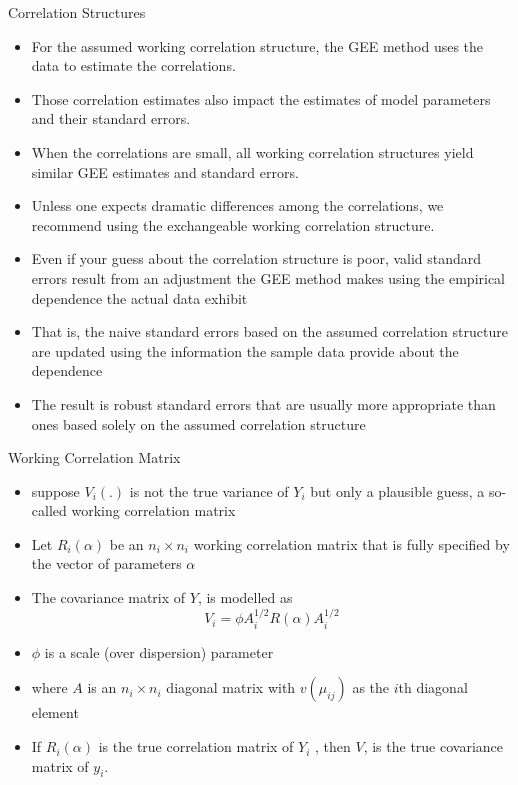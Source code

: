 \documentclass{beamer}
\begin{document}
\begin{frame} {Correlation Structures}
\begin{itemize}
\item For the assumed working correlation structure, the GEE method uses the data to estimate the correlations. \vspace{0.25cm}
\item Those correlation estimates also impact the estimates of model parameters and their standard errors. \vspace{0.25cm}
\item When the correlations are small, all working correlation structures yield similar GEE estimates and standard errors. \vspace{0.25cm}
\item Unless one expects dramatic differences among the correlations, we recommend using the exchangeable working correlation structure.
\end{itemize}
\end{frame}

\begin{frame}
\begin{itemize}
\item Even if your guess about the correlation structure is poor, valid standard errors result from an adjustment the GEE method makes using the empirical dependence the actual data exhibit \vspace{0.25cm}
\item That is, the naive standard errors based on the assumed correlation structure are updated using the information the sample data provide about the dependence \vspace{0.25cm}
\item The result is robust standard errors that are usually more appropriate than ones based solely on the assumed correlation structure
\end{itemize}
\end{frame}

\begin{frame}{ Working Correlation Matrix}
\begin{itemize}
	\item suppose $V_i(.)$ is not the true variance of $Y_i$ but only a plausible guess, a so-called working correlation matrix
	\item Let $R_i(\alpha)$ be an $n_i\times n_i$ working correlation matrix that is fully specified by the vector of parameters $\alpha$
	\item The covariance matrix of $Y$, is modelled as 
	\[V_i=\phi A^{1/2}_iR(\alpha)A^{1/2}_i\]
	\item $\phi$ is a scale (over dispersion) parameter
	\item where $A$ is an $n_i\times n_i$ diagonal matrix with $v(\mu_{ij})$ as the	$i$th diagonal element
	\item If $R_i(\alpha)$ is the true correlation matrix of $Y_i$ , then $V$, is the true covariance matrix of $y_i$.
	
\end{itemize}
\end{frame}
\end{document}
